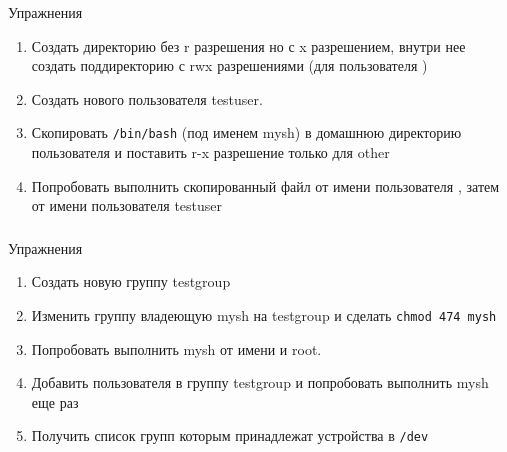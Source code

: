 \begin{frame}
    \frametitle{}
	\begin{block}{Упражнения}
		\begin{enumerate}
			\item Создать директорию без r разрешения но с x разрешением, внутри нее создать поддиректорию с rwx разрешениями (для пользователя )
			\item Создать нового пользователя testuser.
			\item Скопировать {\tt /bin/bash} (под именем mysh) в домашнюю директорию пользователя   и поставить r-x разрешение только для other
			\item Попробовать выполнить скопированный файл от имени пользователя , затем от имени пользователя testuser
       \end{enumerate}
    \end{block}
\end{frame}
\begin{frame}
    \frametitle{}
	\begin{block}{Упражнения}
		\begin{enumerate}
			\item Создать новую группу testgroup
			\item Изменить группу владеющую mysh на testgroup и сделать {\tt chmod 474 mysh}
			\item Попробовать выполнить mysh от имени  и root. 
			\item Добавить пользователя  в группу testgroup и попробовать выполнить mysh еще раз
			\item Получить список групп которым принадлежат устройства в {\tt /dev}
		\end{enumerate}
	\end{block}
\end{frame}

